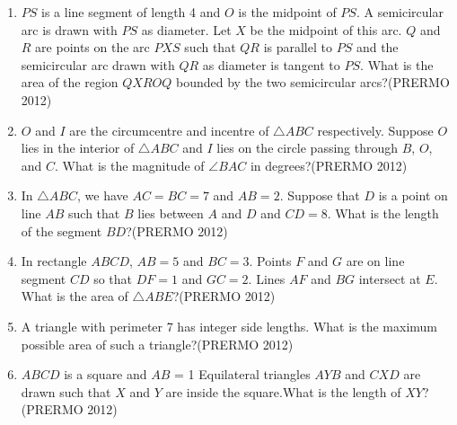 \begin{enumerate}
\item $PS$ is a line segment of length 4 and $O$ is the midpoint of $PS$. A semicircular arc is drawn with $PS$ as diameter. Let $X$ be the midpoint of this arc. $Q$ and $R$ are points on the arc $PXS$ such that $QR$ is parallel to $PS$ and the semicircular arc drawn with $QR$ as diameter is tangent to $PS$. What is the area of the region $QXROQ$ bounded by the two semicircular arcs?\hfill(PRERMO 2012)
\item $O$ and $I$ are the circumcentre and incentre of $\triangle ABC$ respectively. Suppose $O$ lies in the interior of $\triangle ABC$ and $I$ lies on the circle passing through $B$, $O$, and $C$. What is the magnitude of $\angle BAC$ in degrees?\hfill(PRERMO 2012)
\item In $\triangle ABC$, we have $AC = BC = 7$ and $AB = 2$. Suppose that $D$ is a point on line $AB$ such that $B$ lies between $A$ and $D$ and $CD = 8$. What is the length of the segment $BD$?\hfill(PRERMO 2012)
\item In rectangle $ABCD$, $AB = 5$ and $BC = 3$. Points $F$ and $G$ are on line segment $CD$ so that $DF = 1$ and $GC = 2$. Lines $AF$ and $BG$ intersect at $E$. What is the area of $\triangle ABE$?\hfill(PRERMO 2012)
\item A triangle with perimeter 7 has integer side lengths. What is the maximum possible area of such a triangle?\hfill(PRERMO 2012)
\item $ABCD$ is a square and $AB$ = 1 Equilateral triangles $AYB$ and $CXD$ are drawn such that $X$ and $Y$ are inside the square.What is the length of $XY$?\hfill(PRERMO 2012)
\end{enumerate}
